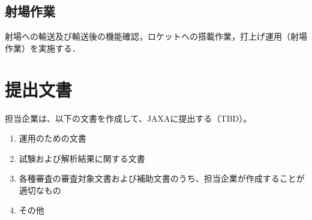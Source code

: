 \documentclass[xelatex,ja=standard]{bxjsarticle}
\begin{document}
\subsection{射場作業}

射場への輸送及び輸送後の機能確認，ロケットへの搭載作業，打上げ運用（射場作業）を実施する．




\section{提出文書}

担当企業は、以下の文書を作成して、JAXAに提出する（TBD）。

\begin{enumerate}
    \item 運用のための文書
    \item 試験および解析結果に関する文書
    \item 各種審査の審査対象文書および補助文書のうち、担当企業が作成することが適切なもの
    \item その他
\end{enumerate}
\end{document}
